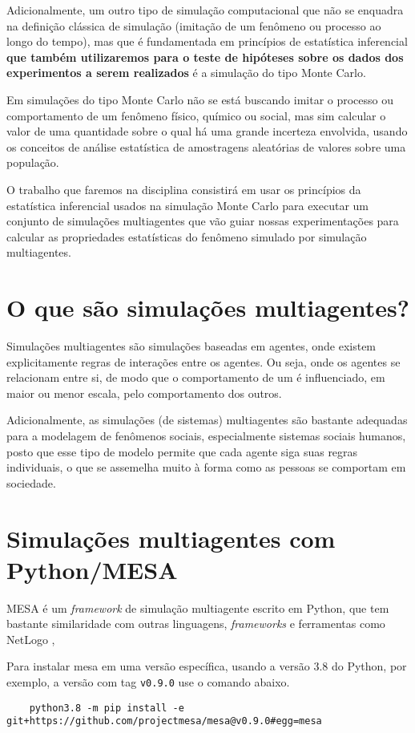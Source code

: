 Adicionalmente, um outro tipo de simulação computacional que não se enquadra na definição clássica de simulação (imitação de um fenômeno ou processo ao longo do tempo), mas que é fundamentada em princípios de estatística inferencial \textbf{que também utilizaremos para o teste de hipóteses sobre os dados dos experimentos a serem realizados} é a simulação do tipo Monte Carlo. 

Em simulações do tipo Monte Carlo não se está buscando imitar o processo ou comportamento de um fenômeno físico, químico ou social, mas sim calcular o valor de uma quantidade sobre o qual há uma grande incerteza envolvida, usando os conceitos de análise estatística de amostragens aleatórias de valores sobre uma população.

O trabalho que faremos na disciplina consistirá em usar os princípios da estatística inferencial usados na simulação Monte Carlo para  executar um conjunto de simulações multiagentes que vão guiar nossas experimentações para calcular as propriedades estatísticas do fenômeno simulado por simulação multiagentes.

\section{O que são simulações multiagentes?}

Simulações multiagentes são simulações baseadas em agentes, onde existem explicitamente regras de interações entre os agentes. Ou seja, onde os agentes se relacionam entre si, de modo que o comportamento de um é influenciado, em maior ou menor escala, pelo comportamento dos outros. 

Adicionalmente, as simulações (de sistemas) multiagentes são bastante adequadas para a modelagem de fenômenos sociais, especialmente sistemas sociais humanos, posto que esse tipo de modelo permite que cada agente siga suas regras individuais, o que se assemelha muito à forma como as pessoas se comportam em sociedade.

\section{Simulações multiagentes com Python/MESA}

MESA \citep{kazil_utilizing_2020} é um \textit{framework} de simulação multiagente escrito em Python, que tem bastante similaridade com outras linguagens, \textit{frameworks} e ferramentas como NetLogo \citep{wilensky_netlogo_1999},  

Para instalar mesa em uma versão específica, usando a versão 3.8 do Python, por exemplo, a versão com tag \verb|v0.9.0| use o comando abaixo.

\begin{verbatim}
    python3.8 -m pip install -e git+https://github.com/projectmesa/mesa@v0.9.0#egg=mesa
\end{verbatim}

